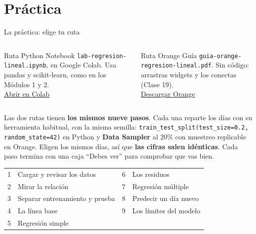 \documentclass[aspectratio=169,11pt]{beamer}
\newcommand{\urlcolab}{https://colab.research.google.com/github/craljimenez/An-lisis_y_Visualizacion_de_Datos_para_la_Toma_de_Decisiones/blob/main/clases/semana10-clase20-regresion-lineal-python/notebooks/lab-regresion-lineal.ipynb}
\newcommand{\urlorange}{https://orangedatamining.com/download/}
\begin{document}
\section{Práctica}
\begin{frame}[t]{La práctica: elige tu ruta}
  \begin{columns}[T,onlytextwidth]
    \begin{block}{Ruta Python}
      \footnotesize Notebook \texttt{lab-regresion-lineal.ipynb}, en Google
      Colab. Usa pandas y scikit-learn, como en los Módulos 1 y 2.\\[3pt]
      \href{\urlcolab}{\color{esumerOrange}Abrir en Colab}
    \end{block}
    \begin{block}{Ruta Orange}
      \footnotesize Guía \texttt{guia-orange-regresion-lineal.pdf}. Sin
      código: arrastras widgets y los conectas (Clase 19).\\[3pt]
      \href{\urlorange}{\color{esumerOrange}Descargar Orange}
    \end{block}
  \end{columns}
  \vspace{0.2cm}
  \small Las dos rutas tienen \textbf{los mismos nueve pasos}. Cada una
  reparte los días con su herramienta habitual, con la misma semilla:
  \texttt{train\_test\_split(test\_size=0.2, random\_state=42)} en Python y
  \textbf{Data Sampler} al 20\% con muestreo replicable en Orange. Eligen los
  mismos días, así que \textbf{las cifras salen idénticas}. Cada paso termina con una caja
  ``Debes ver'' para comprobar que vas bien.
  \vspace{0.1cm}

  \footnotesize
  \renewcommand{\arraystretch}{1.1}
  \begin{tabular}{@{}L{0.5cm}L{5.7cm}L{0.5cm}L{6.0cm}@{}}
    1 & Cargar y revisar los datos & 6 & Los residuos \\
    2 & Mirar la relación & 7 & Regresión múltiple \\
    3 & Separar entrenamiento y prueba & 8 & Predecir un día nuevo \\
    4 & La línea base & 9 & Los límites del modelo \\
    5 & Regresión simple & & \\
  \end{tabular}
\end{frame}
\end{document}
